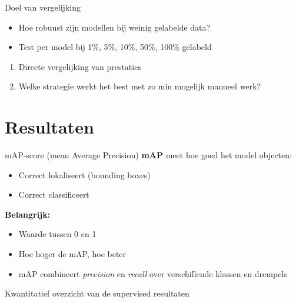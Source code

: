 \documentclass[aspectratio=169]{beamer}
\begin{document}
    \begin{frame}{Doel van vergelijking}
        \begin{itemize}
            \item Hoe robuust zijn modellen bij weinig gelabelde data?
            \item Test per model bij 1\%, 5\%, 10\%, 50\%, 100\% gelabeld
        \end{itemize}
        \begin{enumerate}[$\Rightarrow$]
            \item Directe vergelijking van prestaties
            \item Welke strategie werkt het best met zo min mogelijk manueel werk?
        \end{enumerate}
    \end{frame}
    
    \section{Resultaten}
    
    \begin{frame}{mAP-score (mean Average Precision)}
        \textbf{mAP} meet hoe goed het model objecten:
        \begin{itemize}
            \item Correct lokaliseert (bounding boxes)
            \item Correct classificeert
        \end{itemize}
        \textbf{Belangrijk:}
        \begin{itemize}
            \item Waarde tussen 0 en 1
            \item Hoe hoger de mAP, hoe beter
            \item mAP combineert \textit{precision} en \textit{recall} over verschillende klassen en drempels
        \end{itemize}
    \end{frame}
    
    \begin{frame}{Kwantitatief overzicht van de supervised resultaten}
        \centering
    \end{frame}
    
\end{document}
